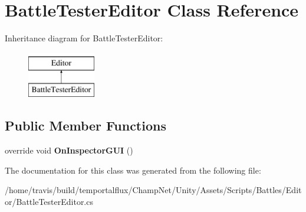 \hypertarget{class_battle_tester_editor}{\section{Battle\-Tester\-Editor Class Reference}
\label{class_battle_tester_editor}
}
Inheritance diagram for Battle\-Tester\-Editor\-:\begin{figure}[H]
\begin{center}
\leavevmode
\includegraphics[height=2.000000cm]{class_battle_tester_editor}
\end{center}
\end{figure}
\subsection*{Public Member Functions}
\begin{DoxyCompactItemize}
\item 
\hypertarget{class_battle_tester_editor_a8826a03758478f108e1241f0c33f3658}{override void {\bfseries On\-Inspector\-G\-U\-I} ()}\label{class_battle_tester_editor_a8826a03758478f108e1241f0c33f3658}

\end{DoxyCompactItemize}


The documentation for this class was generated from the following file\-:\begin{DoxyCompactItemize}
\item 
/home/travis/build/temportalflux/\-Champ\-Net/\-Unity/\-Assets/\-Scripts/\-Battles/\-Editor/Battle\-Tester\-Editor.\-cs\end{DoxyCompactItemize}
